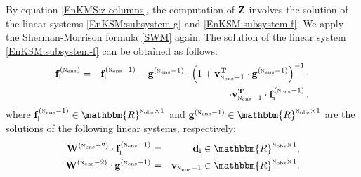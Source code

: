 \documentclass[12pt]{article}
\newcommand{\Nobs}{\textsc{n}_{{\rm obs}}}
\newcommand{\Nens}{\textsc{n}_{{\rm ens}}}
\newcommand{\Z}{{\bf Z}}
\renewcommand{\d}[1]{{\bf d}_{\rm #1}}
\newcommand{\W}[1]{{{\bf W}^{\left ( {\rm #1} \right )}}}
\renewcommand{\v}[1]{{\bf v}_{{\rm #1}}}
\renewcommand{\Re}{\mathbbm{R}}
\newcommand{\invM}[1]{\left( #1 \right )^{-1}}
\newcommand{\g}[1]{{\bf g}^{\left({\rm #1}\right)}}
\newcommand{\f}[2]{{{\bf f}_{{\rm #2}}^{\left({ \rm #1}\right)}}}
\begin{document}
By equation \eqref{EnKMS:z-columns}, the computation of $\Z$ involves the solution of the linear systems \eqref{EnKSM:subsystem-g} and \eqref{EnKSM:subsystem-f}. We apply the Sherman-Morrison formula  \eqref{SWM} again. The solution of the linear system \eqref{EnKSM:subsystem-f} can be obtained as follows:
\begin{eqnarray} \nonumber
\displaystyle \f{\Nens}{i} &=& \f{\Nens-1}{i}-\g{\Nens-1} \cdot   \invM{1+\v{\Nens-1}^{\bf T} \cdot \g{\Nens-1}} \cdot \\
 & &\qquad \cdot \v{\Nens-1}^{\bf T} \cdot \f{\Nens-1}{i}\,,
\end{eqnarray}
where $\f{\Nens-1}{i} \in \Re^{\Nobs \times 1}$ and $\g{\Nens-1} \in \Re^{\Nobs \times 1}$ are the solutions of the following linear systems, respectively:
\begin{eqnarray}
\label{EnKSM:subsystems-for-f} \nonumber
\displaystyle \W{\Nens-2} \cdot \f{\Nens-1}{i} &=& \d{i} \in \Re^{\Nobs \times 1}, \\ \nonumber
\W{\Nens-2} \cdot \g{\Nens-1} &=& \v{\Nens-1} \in \Re^{\Nobs \times 1}.
\end{eqnarray}
\end{document}
